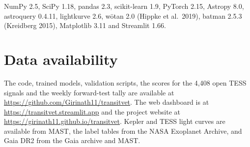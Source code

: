 \documentclass[fleqn,usenatbib]{mnras}
\begin{document}
NumPy 2.5, SciPy 1.18, pandas 2.3, scikit-learn 1.9, PyTorch 2.15, Astropy 8.0, astroquery 0.4.11, lightkurve 2.6, wōtan 2.0 (Hippke et al.~2019), batman 2.5.3 (Kreidberg 2015), Matplotlib 3.11 and Streamlit 1.66.

\section*{Data availability}

The code, trained models, validation scripts, the scores for the 4,408 open TESS signals and the weekly forward-test tally are available at \url{https://github.com/Girinath11/transitvet}. The web dashboard is at \url{https://transitvet.streamlit.app} and the project website at \url{https://girinath11.github.io/transitvet}. Kepler and TESS light curves are available from MAST, the label tables from the NASA Exoplanet Archive, and Gaia DR2 from the Gaia archive and MAST.
\end{document}
